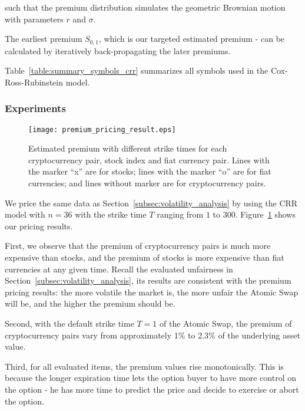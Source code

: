 such that the premium distribution simulates the geometric Brownian motion~\cite{karatzas1998brownian} with parameters $r$ and $\sigma$.

The earliest premium $S_{0, 1}$, which is our targeted estimated premium - can be calculated by iteratively back-propagating the later premiums.

Table~\ref{table:summary_symbols_crr} summarizes all symbols used in the Cox-Ross-Rubinstein model. 

\subsubsection{Experiments}

\begin{figure}
    \texttt{[image: premium\_pricing\_result.eps]}
    \caption{Estimated premium with different strike times for each cryptocurrency pair, stock index and fiat currency pair. Lines with the marker ``x'' are for stocks; lines with the marker ``o'' are for fiat currencies; and lines without marker are for cryptocurrency pairs.}
    \label{fig:premium_pricing_result}
\end{figure}

We price the same data as Section~\ref{subsec:volatility_analysis} by using the CRR model with $n = 36$ with the strike time $T$ ranging from $1$ to $300$.
Figure~\ref{fig:premium_pricing_result} shows our pricing results.

First, we observe that the premium of cryptocurrency pairs is much more expensive than stocks, and the premium of stocks is more expensive than fiat currencies at any given time.
Recall the evaluated unfairness in Section~\ref{subsec:volatility_analysis}, its results are consistent with the premium pricing results: the more volatile the market is, the more unfair the Atomic Swap will be, and the higher the premium should be.

Second, with the default strike time $T = 1$ of the Atomic Swap, the premium of cryptocurrency pairs vary from approximately 1\% to 2.3\% of the underlying asset value.

Third, for all evaluated items, the premium values rise monotonically.
This is because the longer expiration time lets the option buyer to have more control on the option -
he has more time to predict the price and decide to exercise or abort the option.